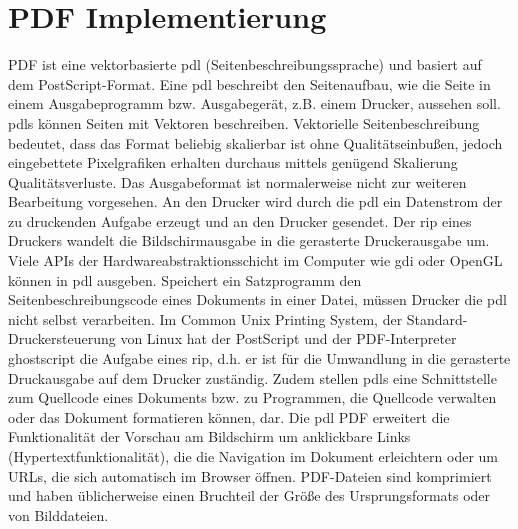 \section{PDF Implementierung}
PDF ist eine vektorbasierte \gls{pdl} (Seitenbeschreibungssprache) und basiert auf dem PostScript-Format. Eine \gls{pdl} beschreibt den Seitenaufbau, wie die Seite in einem Ausgabeprogramm bzw. Ausgabegerät, z.B. einem Drucker, aussehen soll. \gls{pdl}s können Seiten mit Vektoren beschreiben. Vektorielle Seitenbeschreibung bedeutet, dass das Format beliebig skalierbar ist ohne Qualitätseinbußen, jedoch eingebettete Pixelgrafiken erhalten durchaus mittels genügend Skalierung Qualitätsverluste. Das Ausgabeformat ist normalerweise nicht zur weiteren Bearbeitung vorgesehen. An den Drucker wird durch die \gls{pdl} ein Datenstrom der zu druckenden Aufgabe erzeugt und an den Drucker gesendet. Der \gls{rip} eines Druckers wandelt die Bildschirmausgabe in die gerasterte Druckerausgabe um. Viele APIs der Hardwareabstraktionsschicht im Computer wie \gls{gdi} oder OpenGL können in \gls{pdl} ausgeben. Speichert ein Satzprogramm den Seitenbeschreibungscode eines Dokuments in einer Datei, müssen Drucker die \gls{pdl} nicht selbst verarbeiten. Im Common Unix Printing System, der Standard-Druckersteuerung von Linux hat der PostScript und der PDF-Interpreter ghostscript die Aufgabe eines \gls{rip}, d.h. er ist für die Umwandlung in die gerasterte Druckausgabe auf dem Drucker zuständig. Zudem stellen \gls{pdl}s eine Schnittstelle zum Quellcode eines Dokuments bzw. zu Programmen, die Quellcode verwalten oder das Dokument formatieren können, dar. Die \gls{pdl} PDF erweitert die Funktionalität der Vorschau am Bildschirm um anklickbare Links (Hypertextfunktionalität), die die Navigation im Dokument erleichtern oder um URLs, die sich automatisch im Browser öffnen. \cite{wiki-pdl} PDF-Dateien sind komprimiert und haben üblicherweise einen Bruchteil der Größe des Ursprungsformats oder von Bilddateien. 

